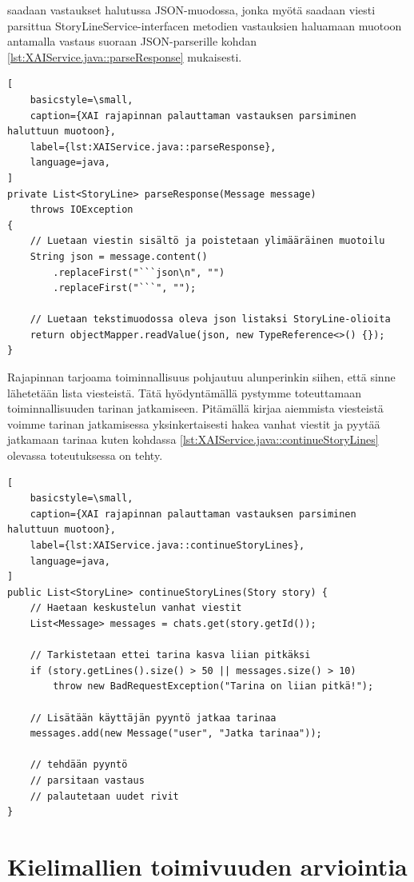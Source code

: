 saadaan vastaukset halutussa JSON-muodossa, jonka myötä saadaan viesti
parsittua StoryLineService-interfacen metodien vastauksien haluamaan
muotoon antamalla vastaus suoraan JSON-parserille kohdan
\ref{lst:XAIService.java::parseResponse} mukaisesti.

\begin{lstlisting}[
    basicstyle=\small,
    caption={XAI rajapinnan palauttaman vastauksen parsiminen haluttuun muotoon},
    label={lst:XAIService.java::parseResponse},
    language=java,
]
private List<StoryLine> parseResponse(Message message)
    throws IOException
{
    // Luetaan viestin sisältö ja poistetaan ylimääräinen muotoilu
    String json = message.content()
        .replaceFirst("```json\n", "")
        .replaceFirst("```", "");

    // Luetaan tekstimuodossa oleva json listaksi StoryLine-olioita
    return objectMapper.readValue(json, new TypeReference<>() {});
}
\end{lstlisting}

Rajapinnan tarjoama toiminnallisuus pohjautuu alunperinkin siihen, että sinne
lähetetään lista viesteistä. Tätä hyödyntämällä pystymme toteuttamaan
toiminnallisuuden tarinan jatkamiseen. Pitämällä kirjaa aiemmista viesteistä
voimme tarinan jatkamisessa yksinkertaisesti hakea vanhat viestit ja pyytää
jatkamaan tarinaa kuten kohdassa \ref{lst:XAIService.java::continueStoryLines}
olevassa toteutuksessa on tehty.

\begin{lstlisting}[
    basicstyle=\small,
    caption={XAI rajapinnan palauttaman vastauksen parsiminen haluttuun muotoon},
    label={lst:XAIService.java::continueStoryLines},
    language=java,
]
public List<StoryLine> continueStoryLines(Story story) {
    // Haetaan keskustelun vanhat viestit
    List<Message> messages = chats.get(story.getId());

    // Tarkistetaan ettei tarina kasva liian pitkäksi
    if (story.getLines().size() > 50 || messages.size() > 10)
        throw new BadRequestException("Tarina on liian pitkä!");

    // Lisätään käyttäjän pyyntö jatkaa tarinaa
    messages.add(new Message("user", "Jatka tarinaa"));

    // tehdään pyyntö
    // parsitaan vastaus
    // palautetaan uudet rivit
}
\end{lstlisting}

\section{Kielimallien toimivuuden arviointia}

